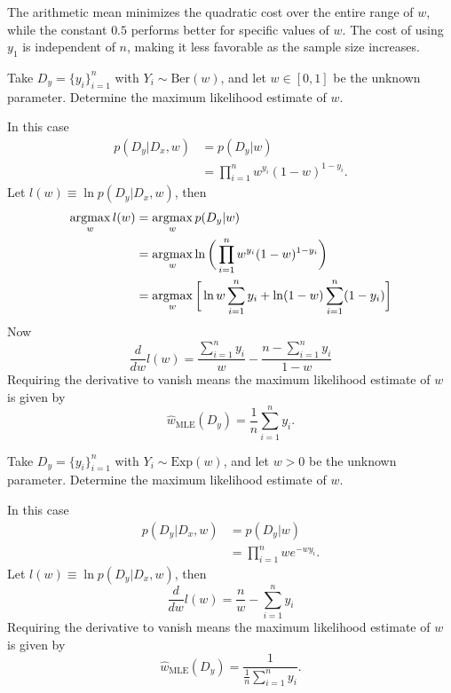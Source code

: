 \begin{example}
	The arithmetic mean minimizes the quadratic cost over the entire range of $w$, while the constant $0.5$ performs better for specific values of $w$. The cost of using $y_1$ is independent of $n$, making it less favorable as the sample size increases.
\end{example}


\begin{example}
	Take $D_y= \{y_i\}_{i=1}^n$ with $Y_i\sim \mathrm{Ber}(w)$, and let $w\in [0,1]$ be the unknown parameter. Determine the maximum likelihood estimate of $w$.\newline
	
	\noindent In this case
	\begin{equation}
		\begin{split}
			p(D_y|D_x,w) & =p(D_y|w)\\
			& = \prod_{i=1}^nw^{y_i}(1-w)^{1-y_i}.
		\end{split}
	\end{equation}
	Let $l(w)\equiv \ln p(D_y|D_x,w)$, then
	\begin{equation}
		\begin{split}
			\operatorname*{argmax}_wl(w) & = \operatorname*{argmax}_wp(D_y|w)\\
			&= \operatorname*{argmax}_w\ln \bigg(\prod_{i=1}^nw^{y_i}(1-w)^{1-y_i}\bigg)\\
			&=\operatorname*{argmax}_w \bigg[\ln w\sum_{i=1}^ny_i + \ln(1-w)\sum_{i=1}^n(1-y_i)\bigg]
		\end{split}
	\end{equation}
	Now 
	\begin{equation}
		\frac{d}{dw}l(w)=\frac{\sum_{i=1}^ny_i}{w}-\frac{n-\sum_{i=1}^ny_i}{1-w}
	\end{equation}
	Requiring the derivative to vanish means the maximum likelihood estimate of $w$ is given by
	\begin{equation}
		\hat{w}_{\text{MLE}}(D_y)=\frac{1}{n}\sum_{i=1}^ny_i.
	\end{equation}
\end{example}
\begin{example}
	Take $D_y= \{y_i\}_{i=1}^n$ with $Y_i\sim \mathrm{Exp}(w)$, and let $w> 0$ be the unknown parameter. Determine the maximum likelihood estimate of $w$.\newline
	
	\noindent In this case
	\begin{equation}
		\begin{split}
			p(D_y|D_x,w)& =p(D_y|w)\\
			& =\prod_{i=1}^nw e^{-w y_i}.
		\end{split}
	\end{equation}
	Let $l(w)\equiv \ln p(D_y|D_x,w)$, then
	\begin{equation}
		\frac{d}{dw}l(w)=\frac{n}{w}-\sum_{i=1}^ny_i
	\end{equation}
	Requiring the derivative to vanish means the maximum likelihood estimate of $w$ is given by
	\begin{equation}
		\hat{w}_{\text{MLE}}(D_y)=\frac{1}{\frac{1}{n}\sum_{i=1}^ny_i}.
	\end{equation}
\end{example}

